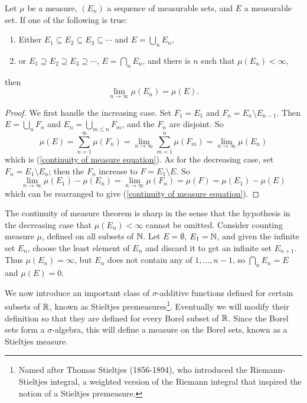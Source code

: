\begin{theorem}
Let $\mu$ be a measure, $(E_n)$ a sequence of measurable sets, and $E$ a measurable set.
If one of the following is true:
\begin{enumerate}
\item Either $E_1 \subseteq E_2 \subseteq E_3 \subseteq \cdots$ and $E = \bigcup_n E_n$,
\item or $E_1 \supseteq E_2 \supseteq E_3 \supseteq \cdots$, $E = \bigcap_n E_n$, and there is $n$ such that $\mu(E_n) < \infty$,
\end{enumerate}
then
\begin{equation}
\label{continuity of measure equation}
\lim_{n \to \infty} \mu(E_n) = \mu(E).
\end{equation}

\end{theorem}
\begin{proof}
We first handle the increasing case.
Set $F_1 = E_1$ and $F_n = E_n \setminus E_{n - 1}$. Then $E = \bigcup_n F_n$ and $E_n = \bigcup_{m \leq n} F_m$, and the $F_n$ are disjoint.
So
$$\mu(E) = \sum_{n=1}^\infty \mu(F_n) = \lim_{n \to \infty} \sum_{m=1}^n \mu(F_m) = \lim_{n \to \infty} \mu(E_n)$$
which is (\ref{continuity of measure equation}).
As for the decreasing case, set $F_n = E_1 \setminus E_n$; then the $F_n$ increase to $F = E_1 \setminus E$. So
$$\lim_{n \to \infty} \mu(E_1) - \mu(E_n) = \lim_{n \to \infty} \mu(F_n) = \mu(F) = \mu(E_1) - \mu(E)$$
which can be rearranged to give (\ref{continuity of measure equation}).
\end{proof}

\begin{example}
The continuity of measure theorem is sharp in the sense that the hypothesis in the decreasing case that $\mu(E_n) < \infty$ cannot be omitted.
Consider counting measure $\mu$, defined on all subsets of $\mathbb{N}$.
Let $E = \emptyset$, $E_1 = \mathbb{N}$, and given the infinite set $E_n$, choose the least element of $E_n$ and discard it to get an infinite set $E_{n + 1}$.
Thus $\mu(E_n) = \infty$, but $E_n$ does not contain any of $1, \dots, n - 1$, so $\bigcap_n E_n = E$ and $\mu(E) = 0$.
\end{example}

\begin{subsec}
We now introduce an important class of $\sigma$-additive functions defined for certain subsets of $\mathbb{R}$, known as Stieltjes premeasures\footnote{Named after Thomas Stieltjes (1856-1894), who introduced the Riemann-Stieltjes integral, a weighted version of the Riemann integral that inspired the notion of a Stieltjes premeasure.}.
Eventually we will modify their definition so that they are defined for every Borel subset of $\mathbb{R}$.
Since the Borel sets form a $\sigma$-algebra, this will define a measure on the Borel sets, known as a Stieltjes measure.
\end{subsec}

